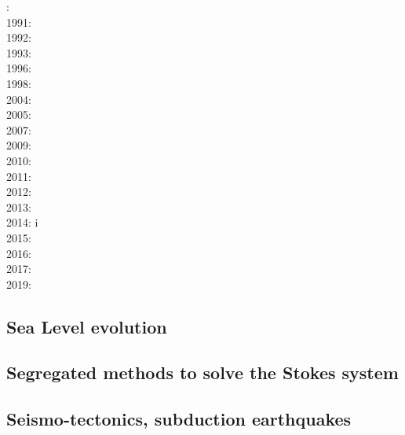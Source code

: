 {\scriptsize
{}: \cite{woid78}\\
1991: \cite{tars91}\\
1992: \cite{zaju92}\\
1993: \cite{nabr93}\cite{vasv93}\cite{wejv93}\cite{wein93}\\
1996: \cite{maar96}\\
1998: \cite{giju98}\\
2004: \cite{istt04}\cite{geim04}\cite{mcmg04}\\
2005: \cite{gebi05}\\
2007: \cite{huja07}\cite{maqs07}\\
2009: \cite{grba09}\\
2010: \cite{albe10}\cite{albi10}\cite{inbe10}\cite{inbe10b}\cite{albs10}\\
2011: \cite{brfo11}\\
2012: \cite{fejr12}\cite{liqi12}\cite{grbe12}\cite{albe12}\cite{grbi12}\cite{goib12}\cite{rukb12}\\
2013: \cite{gobi13}\cite{nipc13}\\
2014: \cite{bakp14}\cite{feka14a}\cite{feka14b}\cite{ghbu14}\cite{nifh14}i\cite{peel14}\\
2015: \cite{feka15}\cite{cofk15}\\
2016: \cite{masg16}\cite{albe16}\\
2017: \cite{grbe17}\cite{henf17}\\
2019: \cite{hadv19}
}

\subsection{Sea Level evolution}

{\scriptsize
\noindent
\cite{pefc78}
\cite{pazw07}
\cite{cohu09}
\cite{conr13}
}

\subsection{Segregated methods to solve the Stokes system}


{\scriptsize
\noindent
\cite{raju91}
\cite{haeh93}
\cite{leru95}
\cite{duto98}
\cite{wade03}
\cite{wade04}
\cite{utne08}
}

\subsection{Seismo-tectonics, subduction earthquakes}

